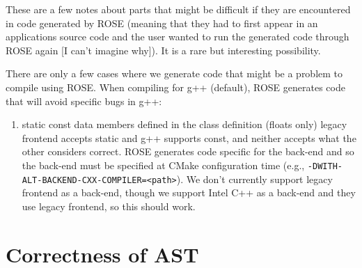     These are a few notes about parts that might be difficult if they are 
encountered in code generated by ROSE (meaning that they had to first appear in 
an applications source code and the user wanted to run the generated code through ROSE
again [I can't imagine why]).  It is a rare but interesting possibility.

   There are only a few cases where we generate code that might be a problem to compile
using ROSE. When compiling for g++ (default), ROSE generates code that will avoid specific
bugs in g++:
\begin{enumerate}
   \item static const data members defined in the class definition (floats only)
         legacy frontend accepts static and g++ supports const, and neither accepts what the other
         considers correct. ROSE generates code specific for the back-end and so the
         back-end must be specified at CMake configuration time (e.g.,
         {\tt -DWITH-ALT-BACKEND-CXX-COMPILER=<path>}).  We
         don't currently support legacy frontend as a back-end, though we support Intel C++ as a
         back-end and they use legacy frontend, so this should work.
\end{enumerate}


\section{Correctness of AST}

